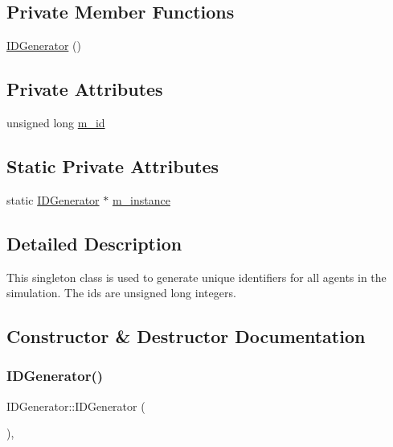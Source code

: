 \subsection*{Private Member Functions}
\begin{DoxyCompactItemize}
\item 
\hyperlink{class_i_d_generator_a8209b55f50b469c47f977660a769b1da}{I\+D\+Generator} ()
\end{DoxyCompactItemize}
\subsection*{Private Attributes}
\begin{DoxyCompactItemize}
\item 
unsigned long \hyperlink{class_i_d_generator_ad0400380525f694b23ff675f4f170893}{m\+\_\+id}
\end{DoxyCompactItemize}
\subsection*{Static Private Attributes}
\begin{DoxyCompactItemize}
\item 
static \hyperlink{class_i_d_generator}{I\+D\+Generator} $\ast$ \hyperlink{class_i_d_generator_a316bacdda67f4cf9bf73fcbd9bf94245}{m\+\_\+instance}
\end{DoxyCompactItemize}


\subsection{Detailed Description}
This singleton class is used to generate unique identifiers for all agents in the simulation. The ids are unsigned long integers. 

\subsection{Constructor \& Destructor Documentation}
\mbox{\label{class_i_d_generator_a8209b55f50b469c47f977660a769b1da}} 
\subsubsection{\texorpdfstring{I\+D\+Generator()}{IDGenerator()}}
{\footnotesize\ttfamily I\+D\+Generator\+::\+I\+D\+Generator (\begin{DoxyParamCaption}{ }\end{DoxyParamCaption})\hspace{0.3cm}{\ttfamily [inline]}, {\ttfamily [private]}}

